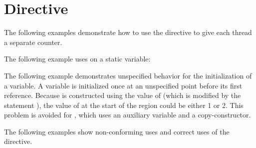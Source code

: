 \section{ Directive}
\label{sec:threadprivate}

The following examples demonstrate how to use the  directive 
 to give each thread a separate counter.



\pagebreak
\begin{ccppspecific}
The following example uses  on a static variable:


The following example demonstrates unspecified behavior for the initialization 
of a  variable. A   variable is initialized 
once at an unspecified point before its first reference. Because  is 
constructed using the value of   (which is modified by the statement 
), the value of   at the start of the  
region could be either 1 or 2. This problem is avoided for , which uses 
an auxiliary  variable and a copy-constructor.

\end{ccppspecific}

The following examples show non-conforming uses and correct uses of the  
directive. 


